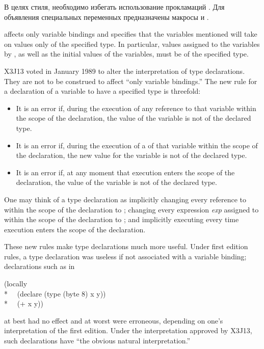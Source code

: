 \begin{flushdesc}
В целях стиля, необходимо избегать использование прокламаций . Для
объявления специальных переменных предназначены макросы  и
.

\item[\cdf{type}]
 affects
only variable bindings and specifies that the
variables mentioned will take on values only of the specified type.
In particular, values assigned to the variables by ,
as well as the initial values of the variables, must be of
the specified type.

\begin{new}
X3J13 voted in January 1989
to alter the interpretation of type declarations.
They are not to be construed to affect ``only variable bindings.''
The new rule for a declaration of a variable to
have a specified type is threefold:
\begin{itemize}
\item It is an error if, during the execution
of any reference to that variable within the scope of the declaration,
the value of the variable is not of the declared type.
\item It is an error if, during the execution
of a  of that variable within the scope of the declaration,
the new value for the variable is not of the declared type.
\item It is an error if, at any moment that execution enters the scope
of the declaration, the value of the variable is not of the
declared type.
\end{itemize}
One may think of a type declaration 
as implicitly changing every reference to  within the scope
of the declaration to ; changing every expression
\emph{exp} assigned to  within the scope of the declaration
to ; and implicitly executing 
every time execution enters the scope of the declaration.

These new rules make type declarations much more useful.  Under first
edition rules, a type declaration was useless if not associated with
a variable binding; declarations such as in
\begin{lisp}
(locally \\*
~~(declare (type (byte 8) x y)) \\*
~~(+ x y))
\end{lisp}
at best had no effect and at worst were erroneous, depending on one's
interpretation of the first edition.  Under the interpretation approved
by X3J13, such declarations have ``the obvious natural interpretation.''


\end{new}
\end{flushdesc}
